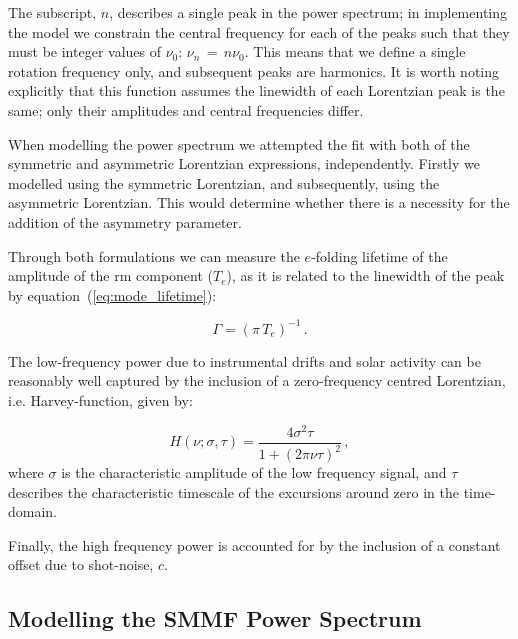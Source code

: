 The subscript, $n$, describes a single peak in the power spectrum; in implementing the model we constrain the central frequency for each of the peaks such that they must be integer values of $\nu_0$: $\nu_n \, = \, n \nu_0$. This means that we define a single rotation frequency only, and subsequent peaks are harmonics. It is worth noting explicitly that this function assumes the linewidth of each Lorentzian peak is the same; only their amplitudes and central frequencies differ.

When modelling the power spectrum we attempted the fit with both of the symmetric and asymmetric Lorentzian expressions, independently. Firstly we modelled using the symmetric Lorentzian, and subsequently, using the asymmetric Lorentzian. This would determine whether there is a necessity for the addition of the asymmetry parameter.

Through both formulations we can measure the $e$-folding lifetime of the amplitude of the \gls{rm} component ($T_e$), as it is related to the linewidth of the peak by equation~(\ref{eq:mode_lifetime}):

\begin{equation}
\Gamma  = (\pi \, T_e)^{-1} \, .
\label{eq:mode_lifetime}
\end{equation}


The low-frequency power due to instrumental drifts and solar activity can be reasonably well captured by the inclusion of a zero-frequency centred Lorentzian, i.e. Harvey-function, given by:

\begin{equation}
H(\nu; \sigma, \tau) = \frac{4{\sigma}^2\tau}{1 + (2\pi \nu\tau)^2} \, ,
\label{eq:harvey}
\end{equation}
%
where $\sigma$ is the characteristic amplitude of the low frequency signal, and $\tau$ describes the characteristic timescale of the excursions around zero in the time-domain.


Finally, the high frequency power is accounted for by the inclusion of a constant offset due to shot-noise, $c$.


\subsection{Modelling the SMMF Power Spectrum}
\label{sec:method_modelling}

